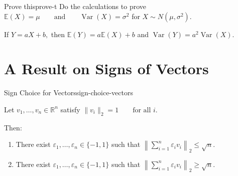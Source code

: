 \begin{question}{Prove this}{prove-t}
Do the calculations to prove
\(
\mathbb{E}(X)=\mu
\qquad\text{and}\qquad
\operatorname{Var}(X)=\sigma^2
\)
for
\(
X\sim N(\mu,\sigma^2).
\)
\end{question}


\begin{remark}

If
\(
Y=aX+b,
\)
then
\(
\mathbb{E}(Y)
=
a\mathbb{E}(X)+b
\)
and
\(
\operatorname{Var}(Y)
=
a^2\operatorname{Var}(X).
\)

\end{remark}


\section{A Result on Signs of Vectors}

\begin{theorem}{Sign Choice for Vectors}{sign-choice-vectors}

Let
\(
v_1,\ldots,v_n\in\mathbb{R}^n
\)
satisfy
\(
\|v_i\|_2=1
\qquad
\text{for all }i.
\)

Then:

\begin{enumerate}

    \item There exist
    \(
    \varepsilon_1,\ldots,\varepsilon_n
    \in\{-1,1\}
    \)
    such that
    \(
    \left\|
    \sum_{i=1}^n
    \varepsilon_i v_i
    \right\|_2
    \leq
    \sqrt{n}.
    \)

    \item There exist
    \(
    \varepsilon_1,\ldots,\varepsilon_n
    \in\{-1,1\}
    \)
    such that
    \(
    \left\|
    \sum_{i=1}^n
    \varepsilon_i v_i
    \right\|_2
    \geq
    \sqrt{n}.
    \)

\end{enumerate}

\end{theorem}


